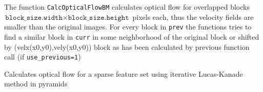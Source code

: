 The function \texttt{CalcOpticalFlowBM} calculates optical
flow for overlapped blocks $\texttt{block\_size.width} \times
\texttt{block\_size.height}$ pixels each, thus the velocity
fields are smaller than the original images. For every block
in \texttt{prev} the functions tries to find a similar block in
\texttt{curr} in some neighborhood of the original block or shifted by
(velx(x0,y0),vely(x0,y0)) block as has been calculated by previous
function call (if \texttt{use\_previous=1})

\label{CalcOpticalFlowPyrLK}

Calculates optical flow for a sparse feature set using iterative Lucas-Kanade method in pyramids


